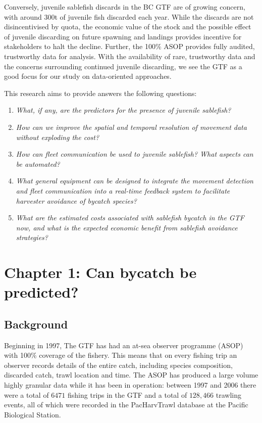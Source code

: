 \documentclass{article}
\begin{document}
Conversely, juvenile sablefish discards in the BC GTF are of growing concern, with around 300t of juvenile fish discarded each year. While the discards are not disincentivised by quota, the economic value of the stock and the possible effect of juvenile discarding on future spawning and landings provides incentive for stakeholders to halt the decline. Further, the 100\% ASOP provides fully audited, trustworthy data for analysis. With the availability of rare, trustworthy data and the concerns surrounding continued juvenile discarding, we see the GTF as a good focus for our study on data-oriented approaches.

This research aims to provide answers the following questions:
\begin{enumerate}
  \item {\it What, if any, are the predictors for the presence of juvenile sablefish?} \label{Q:predictors}
  \item {\it How can we improve the spatial and temporal resolution of movement data without exploding the cost?}
  \item {\it How can fleet communication be used to juvenile sablefish? What aspects can be automated?}
  \item {\it What general equipment can be designed to integrate the movement detection and fleet communication into a real-time feedback system to facilitate harvester avoidance of bycatch species?}
  \item {\it What are the estimated costs associated with sablefish bycatch in the GTF now, and what is the expected economic benefit from sablefish avoidance strategies?}
\end{enumerate}


\section{Chapter 1: Can bycatch be predicted?}\label{sec:predBycatch}

\subsection{Background}

Beginning in 1997, The GTF has had an at-sea observer programme (ASOP) with 100\% coverage of the fishery. This means that on every fishing trip an observer records details of the entire catch, including species composition, discarded catch, trawl location and time. The ASOP has produced a large volume highly granular data while it has been in operation: between 1997 and 2006 there were a total of $6471$ fishing trips in the GTF and a total of $128,466$ trawling events, all of which were recorded in the PacHarvTrawl database at the Pacific Biological Station.
\end{document}
